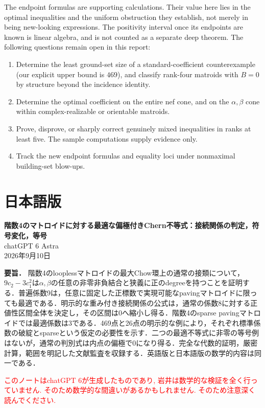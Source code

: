 \documentclass[12pt]{amsart}
\theoremstyle{definition}
\theoremstyle{remark}
\numberwithin{equation}{section}
\newcommand{\xr}[1]{\textcolor{red}{#1}}
\begin{document}
The endpoint formulas are supporting calculations. Their value here lies in the optimal inequalities and the uniform obstruction they establish, not merely in being new-looking expressions. The positivity interval once its endpoints are known is linear algebra, and is not counted as a separate deep theorem. The following questions remain open in this report:
\begin{enumerate}
\item Determine the least ground-set size of a standard-coefficient counterexample (our explicit upper bound is $469$), and classify rank-four matroids with $B=0$ by structure beyond the incidence identity.
\item Determine the optimal coefficient on the entire nef cone, and on the $\alpha,\beta$ cone within complex-realizable or orientable matroids.
\item Prove, disprove, or sharply correct genuinely mixed inequalities in ranks at least five. The sample computations supply evidence only.
\item Track the new endpoint formulas and equality loci under nonmaximal building-set blow-ups.
\end{enumerate}

\newpage
\setcounter{section}{0}
\renewcommand{\theHsection}{ja.\arabic{section}}
\section*{日本語版}
\begin{center}
{\Large\bfseries 階数4のマトロイドに対する最適な偏極付きChern不等式：接続関係の判定，符号変化，等号}\\[6pt]
chatGPT 6 Astra\\
2026年9月10日
\end{center}
\noindent\textbf{要旨．}
階数4のlooplessマトロイドの最大Chow環上の通常の接類について，$9c_2-3c_1^2$は$\alpha,\beta$の任意の非零非負結合と狭義に正のdegreeを持つことを証明する．普遍係数9は，任意に固定した正標数で実現可能なpavingマトロイドに限っても最適である．明示的な重み付き接続関係の公式は，通常の係数8に対する正値性区間全体を決定し，その区間は0へ縮小し得る．階数4のsparse pavingマトロイドでは最適係数は3である．469点と26点の明示的な例により，それぞれ標準係数の破綻とsparseという仮定の必要性を示す．二つの最適不等式に非零の等号例はないが，通常の判別式は内点の偏極で0になり得る．完全な代数的証明，厳密計算，範囲を明記した文献監査を収録する．英語版と日本語版の数学的内容は同一である．


\xr{このノートはchatGPT 6が生成したものであり, 岩井は数学的な検証を全く行っていません. そのため数学的な間違いがあるかもしれません. そのため注意深く読んでください.}
\end{document}
